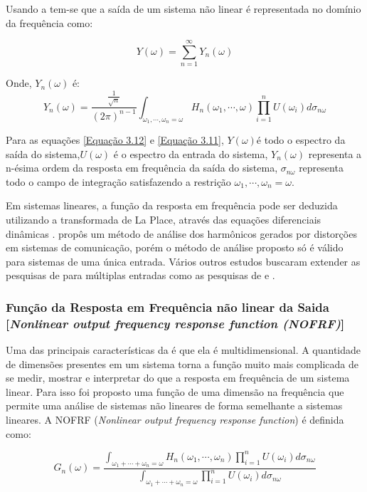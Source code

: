Usando a \FRFG tem-se que a saída de um sistema não linear é representada no domínio da frequência como:

\begin{equation}
Y(\omega) = \sum_{n=1}^{\infty} Y_{n}(\omega)
\label{Equação 3.11}
\end{equation}

Onde, $Y_{n}(\omega)$ é:
\begin{equation}
Y_{n}(\omega) = \dfrac{\frac{1}{\sqrt{n}}}{(2 \pi)^{n-1}}\int_{\omega_{1},\cdots,\omega_{n}=\omega}H_{n}(\omega_{1},\cdots,\omega)\prod_{i=1}^{n}U(\omega_{i}) d\sigma_{n\omega}
\label{Equação 3.12}
\end{equation}

Para as equações \ref{Equação 3.12} e \ref{Equação 3.11}, $Y(\omega)$é todo o espectro da saída do sistema,$U(\omega)$ é o espectro da entrada do sistema, $Y_{n}(\omega)$ representa a n-ésima ordem da resposta em frequência da saída do sistema, $\sigma_{n\omega}$ representa todo o campo de integração satisfazendo a restrição $\omega_{1},\cdots,\omega_{n}=\omega$.

Em sistemas lineares, a função da resposta em frequência pode ser deduzida utilizando a transformada de La Place, através das equações diferenciais dinâmicas \cite{cheng2017volterra}. \cite{bedrosian1971output} propôs um método de análise dos harmônicos gerados por distorções em sistemas de comunicação, porém o método de análise proposto só é válido para sistemas de uma única entrada. Vários outros estudos buscaram extender as pesquisas de \cite{bedrosian1971output} para múltiplas entradas como as pesquisas de \cite{Swain} e \cite{HeFei}.

\subsubsection*{Função da Resposta em Frequência não linear da Saida [\textit{Nonlinear output frequency response function (NOFRF)}]}
Uma das principais características da \FRFG é que ela é multidimensional. A quantidade de dimensões presentes em um sistema torna a função muito mais complicada de se medir, mostrar e interpretar do que a resposta em frequência de um sistema linear. Para isso foi proposto uma função de uma dimensão na frequência que permite uma análise de sistemas não lineares de forma semelhante a sistemas lineares. A NOFRF (\textit{Nonlinear output frequency response function}) é definida como:

\begin{equation}
G_{n}(\omega) = \dfrac{\int_{\omega_{1}+\cdots+\omega_{n}=\omega}H_{n}(\omega_{1},\cdots,\omega_{n})\prod_{i=1}^{n}U(\omega_{i})d\sigma_{n\omega} }{\int_{\omega_{1}+\cdots+\omega_{n}=\omega}\prod_{i=1}^{n}U(\omega_{i})d\sigma_{n\omega}}
\label{Equação 3.13}
\end{equation}

